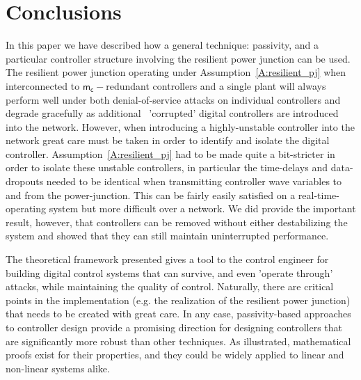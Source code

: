 \section{Conclusions}
\label{S:conclusions}
In this paper we have described how a general technique: passivity,
and a particular controller structure involving the resilient power
junction can be used.  The resilient power junction operating under
Assumption~\ref{A:resilient_pj} when interconnected to
$\mathsf{m_c}-$redundant controllers and a single plant will always
perform well under both denial-of-service attacks on individual
controllers and degrade gracefully as additional \sop\ 'corrupted' digital
controllers are introduced into the network.
However, when introducing a highly-unstable controller into the network
great care must be taken in order to identify and isolate the digital
controller.  Assumption~\ref{A:resilient_pj} had to be made quite a
bit-stricter in order to isolate these unstable controllers, in
particular the time-delays and data-dropouts needed to be identical
when transmitting controller wave variables to and from the
power-junction.  This can be fairly easily satisfied on a
real-time-operating system but more difficult over a network.  We did
provide the important result, however, that controllers can be removed
without either destabilizing the system and showed that they can still
maintain uninterrupted performance.

The theoretical framework presented gives a tool to the control
engineer for building digital control systems that can survive, and
even 'operate through' attacks, while maintaining the quality of
control.  Naturally, there are critical points in the implementation
(e.g. the realization of the resilient power junction) that needs to
be created  with great care.  In any case, passivity-based approaches
to controller design provide a promising direction for designing
controllers that are significantly more robust than other techniques.
As illustrated, mathematical proofs exist for their properties, and
they could be widely applied to linear and non-linear systems alike.
